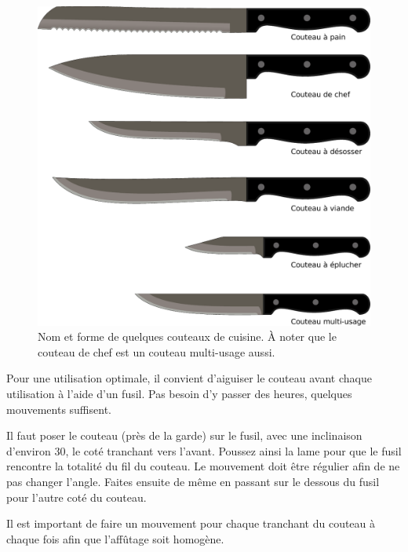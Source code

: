 \documentclass[a4paper,twoside,openright]{report}
\begin{document}
\begin{figure}[htb]
\centering
\includegraphics[width=0.6\linewidth]{figures/couteaux.pdf}
\caption{Nom et forme de quelques couteaux de cuisine. À noter que le couteau de chef est un couteau multi-usage aussi.}
\end{figure}

\begin{remarque}
Pour une utilisation optimale, il convient d'aiguiser le couteau avant chaque utilisation à l'aide d'un fusil. Pas besoin d'y passer des heures, quelques mouvements suffisent.

Il faut poser le couteau (près de la garde) sur le fusil, avec une inclinaison d'environ 30\degre, le coté tranchant vers l'avant. Poussez ainsi la lame pour que le fusil rencontre la totalité du fil du couteau. Le mouvement doit être régulier afin de ne pas changer l'angle. Faites ensuite de même en passant sur le dessous du fusil pour l'autre coté du couteau.

Il est important de faire un mouvement pour chaque tranchant du couteau à chaque fois afin que l'affûtage soit homogène.
\end{remarque}

\end{document}
